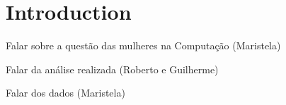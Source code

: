 \section{Introduction}\label{sec:intro}%
Falar sobre a questão das mulheres na Computação (Maristela)

Falar da análise realizada (Roberto e Guilherme)

Falar dos dados (Maristela)
